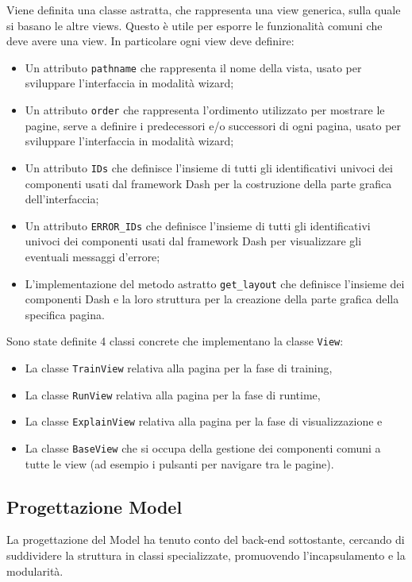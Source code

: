 Viene definita una classe astratta, che rappresenta una view generica, sulla quale si basano le altre views. Questo è utile per esporre le funzionalità comuni che deve avere una view.
In particolare ogni view deve definire:

\begin{itemize}

\item Un attributo \texttt{pathname} che rappresenta il nome della vista, usato per sviluppare l'interfaccia in modalità wizard;

\item Un attributo \texttt{order} che rappresenta l'ordimento utilizzato per mostrare le pagine, serve a definire i predecessori e/o successori di ogni pagina, usato per sviluppare l'interfaccia in modalità wizard;

\item Un attributo \texttt{IDs} che definisce l'insieme di tutti gli identificativi univoci dei componenti usati dal framework Dash per la costruzione della parte grafica dell'interfaccia; 

\item Un attributo \texttt{ERROR\_IDs} che definisce l'insieme di tutti gli identificativi univoci dei componenti usati dal framework Dash per visualizzare gli eventuali messaggi d'errore; 

\item L'implementazione del metodo astratto \texttt{get\_layout} che definisce l'insieme dei componenti Dash e la loro struttura per la creazione della parte grafica della specifica pagina.

\end{itemize}

Sono state definite 4 classi concrete che implementano la classe \texttt{View}:
\begin{itemize}
\item La classe \texttt{TrainView} relativa alla pagina per la fase di training, 
\item La classe \texttt{RunView} relativa alla pagina per la fase di runtime, 
\item La classe \texttt{ExplainView} relativa alla pagina per la fase di visualizzazione e 
\item La classe \texttt{BaseView} che si occupa della gestione dei componenti comuni a tutte le view (ad esempio i pulsanti per navigare tra le pagine).
\end{itemize}


\subsection{Progettazione Model}
La progettazione del Model ha tenuto conto del back-end sottostante, cercando di suddividere la struttura in classi specializzate, promuovendo l'incapsulamento e la modularità.

